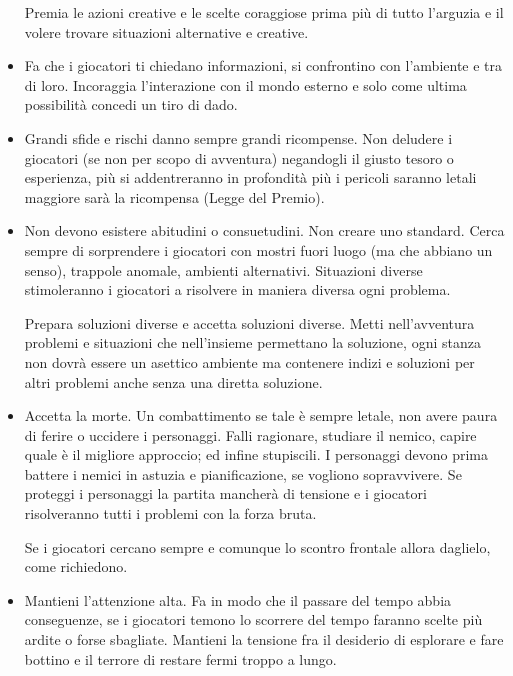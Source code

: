\begin{multicols}{2}
\begin{itemize}[leftmargin=*]
Premia le azioni creative e le scelte coraggiose prima più di tutto l'arguzia e il volere trovare situazioni alternative e creative.

\item
Fa che i giocatori ti chiedano informazioni, si confrontino con l'ambiente e tra di loro. Incoraggia l'interazione con il mondo esterno e solo come ultima possibilità concedi un tiro di dado.

\item
Grandi sfide e rischi danno sempre grandi ricompense. Non deludere i giocatori (se non per scopo di avventura) negandogli il giusto tesoro o esperienza, più si addentreranno in profondità più i pericoli saranno letali maggiore sarà la ricompensa (Legge del Premio).

\item
Non devono esistere abitudini o consuetudini. Non creare uno standard.
Cerca sempre di sorprendere i giocatori con mostri fuori luogo (ma che abbiano un senso), trappole anomale, ambienti alternativi. Situazioni diverse stimoleranno i giocatori a risolvere in maniera diversa ogni problema.

Prepara soluzioni diverse e accetta soluzioni diverse. Metti nell'avventura problemi e situazioni che nell'insieme permettano la soluzione, ogni stanza non dovrà essere un asettico ambiente ma contenere indizi e soluzioni per altri problemi anche senza una diretta soluzione.

\item
Accetta la morte. Un combattimento se tale è sempre letale, non avere paura di ferire o uccidere i personaggi. Falli ragionare, studiare il nemico, capire quale è il migliore approccio; ed infine stupiscili. I personaggi devono prima battere i nemici in astuzia e pianificazione, se vogliono sopravvivere.
Se proteggi i personaggi la partita mancherà di tensione e i giocatori risolveranno tutti i problemi con la forza bruta.

Se i giocatori cercano sempre e comunque lo scontro frontale allora daglielo, come richiedono.

\item
Mantieni l'attenzione alta. Fa in modo che il passare del tempo abbia conseguenze, se i giocatori temono lo scorrere del tempo faranno scelte più ardite o forse sbagliate. Mantieni la tensione fra il desiderio di esplorare e fare bottino e il terrore di restare fermi troppo a lungo.


\end{itemize}
\end{multicols}

